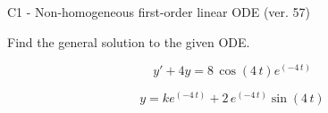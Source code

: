 \begin{exercise}
  \begin{exerciseTitle}C1 - Non-homogeneous first-order linear ODE (ver. 57)\end{exerciseTitle}
  \begin{exerciseStatement}
    
Find the general solution to the given ODE.

    
\[y'+4y= 8 \, \cos\left(4 \, t\right) e^{\left(-4 \, t\right)}\]

  \end{exerciseStatement}
  \begin{exerciseAnswer}
    
\[y= k e^{\left(-4 \, t\right)} + 2 \, e^{\left(-4 \, t\right)} \sin\left(4 \, t\right)\]

  \end{exerciseAnswer}
\end{exercise}